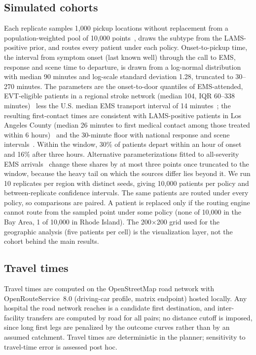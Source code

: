 \subsection{Simulated cohorts}
Each replicate samples 1,000 pickup locations without replacement from a population-weighted pool of 10,000 points~\cite{meta2019}, draws the subtype from the LAMS-positive prior, and routes every patient under each policy. Onset-to-pickup time, the interval from symptom onset (last known well) through the call to EMS, response and scene time to departure, is drawn from a log-normal distribution with median 90 minutes and log-scale standard deviation 1.28, truncated to 30--270 minutes. The parameters are the onset-to-door quantiles of EMS-attended, EVT-eligible patients in a regional stroke network (median 104, IQR 60--338 minutes)~\cite{hegenberg2026} less the U.S. median EMS transport interval of 14 minutes~\cite{cash2022,chari2022}; the resulting first-contact times are consistent with LAMS-positive patients in Los Angeles County (median 26 minutes to first medical contact among those treated within 6 hours)~\cite{bosson2023} and the 30-minute floor with national response and scene intervals~\cite{chari2022}. Within the window, 30\% of patients depart within an hour of onset and 16\% after three hours. Alternative parameterizations fitted to all-severity EMS arrivals~\cite{adeoye2017} change these shares by at most three points once truncated to the window, because the heavy tail on which the sources differ lies beyond it. We run 10 replicates per region with distinct seeds, giving 10,000 patients per policy and between-replicate confidence intervals. The same patients are routed under every policy, so comparisons are paired. A patient is replaced only if the routing engine cannot route from the sampled point under some policy (none of 10,000 in the Bay Area, 1 of 10,000 in Rhode Island). The 200$\times$200 grid used for the geographic analysis (five patients per cell) is the visualization layer, not the cohort behind the main results.

\subsection{Travel times}
Travel times are computed on the OpenStreetMap road network with OpenRouteService~8.0 (driving-car profile, matrix endpoint) hosted locally. Any hospital the road network reaches is a candidate first destination, and inter-facility transfers are computed by road for all pairs; no distance cutoff is imposed, since long first legs are penalized by the outcome curves rather than by an assumed catchment. Travel times are deterministic in the planner; sensitivity to travel-time error is assessed post hoc.

